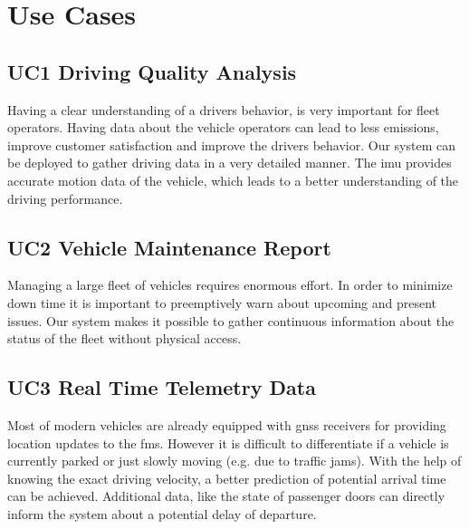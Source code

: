 \newpage
\section{Use Cases}
\label{sec:use_cases}
\subsection{UC1 Driving Quality Analysis}
Having a clear understanding of a drivers behavior, is very important for fleet operators. Having data about the vehicle operators can lead to less emissions, improve customer satisfaction and improve the drivers behavior. Our system can be deployed to gather driving data in a very detailed manner.
The \acrlong{imu} provides accurate motion data of the vehicle, which leads to a better understanding of the driving performance.

\subsection{UC2 Vehicle Maintenance Report}
Managing a large fleet of vehicles requires enormous effort. In order to minimize down time it is important to preemptively warn about upcoming and present issues. Our system makes it possible to gather continuous information about the status of the fleet without physical access. 

\subsection{UC3 Real Time Telemetry Data}
Most of modern vehicles are already equipped with \acrshort{gnss} receivers for providing location updates to the \acrlong{fms}. However it is difficult to differentiate if a vehicle is currently parked or just slowly moving (e.g. due to traffic jams). With the help of knowing the exact driving velocity, a better prediction of potential arrival time can be achieved. Additional data, like the state of passenger doors can directly inform the system about a potential delay of departure.